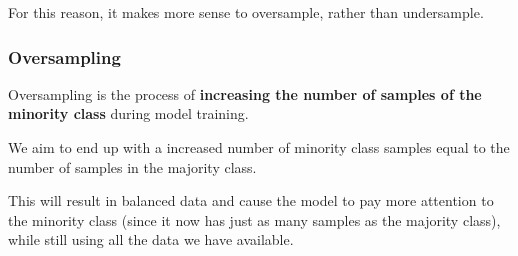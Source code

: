 \documentclass[11pt]{article}
\begin{document}
For this reason, it makes more sense to oversample, rather than
undersample.

    \subsubsection{Oversampling}\label{oversampling}

Oversampling is the process of \textbf{increasing the number of samples
of the minority class} during model training.

We aim to end up with a increased number of minority class samples equal
to the number of samples in the majority class.

This will result in balanced data and cause the model to pay more
attention to the minority class (since it now has just as many samples
as the majority class), while still using all the data we have
available.
\end{document}
